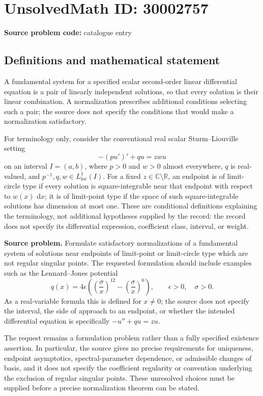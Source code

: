 \documentclass[11pt]{article}
\newcommand{\R}{\mathbb{R}}
\newcommand{\C}{\mathbb{C}}
\newcommand{\dd}{\,\mathrm{d}}
\begin{document}
\section*{UnsolvedMath ID: 30002757}
\textbf{Source problem code:} catalogue entry
\subsection{Definitions and mathematical statement}
A fundamental system for a specified scalar second-order linear differential equation is a pair of linearly independent solutions, so that every solution is their linear combination. A normalization prescribes additional conditions selecting such a pair; the source does not specify the conditions that would make a normalization satisfactory.

For terminology only, consider the conventional real scalar Sturm--Liouville setting
\[
 -(p u')'+q u=z w u
\]
on an interval \(I=(a,b)\), where \(p>0\) and \(w>0\) almost everywhere, \(q\) is real-valued, and \(p^{-1},q,w\in L^1_{\mathrm{loc}}(I)\). For a fixed \(z\in\C\setminus\R\), an endpoint is of limit-circle type if every solution is square-integrable near that endpoint with respect to \(w(x)\,\dd x\); it is of limit-point type if the space of such square-integrable solutions has dimension at most one. These are conditional definitions explaining the terminology, not additional hypotheses supplied by the record: the record does not specify its differential expression, coefficient class, interval, or weight.

\textbf{Source problem.} Formulate satisfactory normalizations of a fundamental system of solutions near endpoints of limit-point or limit-circle type which are not regular singular points. The requested formulation should include examples such as the Lennard--Jones potential
\[
 q(x)=4\epsilon\left(\left(\frac{\sigma}{x}\right)^{12}-\left(\frac{\sigma}{x}\right)^6\right),
 \qquad \epsilon>0,\quad \sigma>0.
\]
As a real-variable formula this is defined for \(x\ne0\); the source does not specify the interval, the side of approach to an endpoint, or whether the intended differential equation is specifically \(-u''+q u=z u\).

The request remains a formulation problem rather than a fully specified existence assertion. In particular, the source gives no precise requirements for uniqueness, endpoint asymptotics, spectral-parameter dependence, or admissible changes of basis, and it does not specify the coefficient regularity or convention underlying the exclusion of regular singular points. These unresolved choices must be supplied before a precise normalization theorem can be stated.
\end{document}
